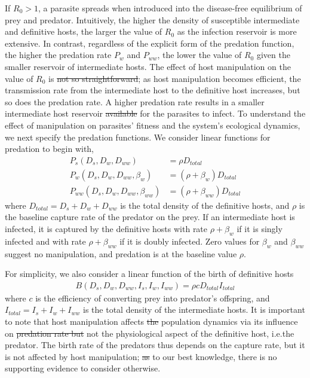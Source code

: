 \documentclass[a4paper]{scrartcl}
\providecommand{\DIFaddtex}[1]{{\protect\color{blue}\uwave{#1}}} %
\providecommand{\DIFdeltex}[1]{{\protect\color{red}\sout{#1}}}                      %
\providecommand{\DIFaddbegin}{} %
\providecommand{\DIFaddend}{} %
\providecommand{\DIFdelbegin}{} %
\providecommand{\DIFdelend}{} %
\providecommand{\DIFadd}[1]{\texorpdfstring{\DIFaddtex{#1}}{#1}} %
\providecommand{\DIFdel}[1]{\texorpdfstring{\DIFdeltex{#1}}{}} %
\newcommand{\DIFscaledelfig}{0.5}
\newlength{\DIFdelgraphicswidth} %
\newlength{\DIFdelgraphicsheight} %
\newcommand{\DIFaddincludegraphics}[2][]{{\color{blue}\fbox{\DIFOincludegraphics[#1]{#2}}}} %
\newcommand{\DIFdelincludegraphics}[2][]{%
\sbox{\DIFdelgraphicsbox}{\DIFOincludegraphics[#1]{#2}}%
\settoboxwidth{\DIFdelgraphicswidth}{\DIFdelgraphicsbox} %
\settoboxtotalheight{\DIFdelgraphicsheight}{\DIFdelgraphicsbox} %
\scalebox{\DIFscaledelfig}{%
\parbox[b]{\DIFdelgraphicswidth}{\usebox{\DIFdelgraphicsbox}\\[-\baselineskip] \rule{\DIFdelgraphicswidth}{0em}}\llap{\resizebox{\DIFdelgraphicswidth}{\DIFdelgraphicsheight}{%
\setlength{\unitlength}{\DIFdelgraphicswidth}%
\begin{picture}(1,1)%
\thicklines\linethickness{2pt} %
{\color[rgb]{1,0,0}\put(0,0){\framebox(1,1){}}}%
{\color[rgb]{1,0,0}\put(0,0){\line( 1,1){1}}}%
{\color[rgb]{1,0,0}\put(0,1){\line(1,-1){1}}}%
\end{picture}%
}\hspace*{3pt}}} %
} %
\DeclareRobustCommand{\DIFaddbegin}{\DIFOaddbegin \let\includegraphics\DIFaddincludegraphics} %
\DeclareRobustCommand{\DIFaddend}{\DIFOaddend \let\includegraphics\DIFOincludegraphics} %
\DeclareRobustCommand{\DIFdelbegin}{\DIFOdelbegin \let\includegraphics\DIFdelincludegraphics} %
\DeclareRobustCommand{\DIFdelend}{\DIFOaddend \let\includegraphics\DIFOincludegraphics} %
\begin{document}
If $R_0 > 1$, a parasite spreads when introduced into the disease-free equilibrium of prey and predator.
Intuitively, the higher the density of susceptible intermediate and definitive hosts, the larger the value of $R_0$ as the infection reservoir is more extensive. 
In contrast, regardless of the explicit form of the predation function, the higher the predation rate $P_w$ and $P_{ww}$, the lower the value of $R_0$ given the smaller reservoir of intermediate hosts. 
The effect of host manipulation on the value of $R_0$ is \DIFdelbegin \DIFdel{not so straightforward}\DIFdelend \DIFaddbegin \DIFadd{more complex}\DIFaddend ; as host manipulation becomes efficient, the transmission rate from the intermediate host to the definitive host increases, but so does the predation rate. 
A higher predation rate results in a smaller intermediate host reservoir \DIFdelbegin \DIFdel{available }\DIFdelend for the parasites to infect. 
To understand the effect of manipulation on parasites' fitness and the system's ecological dynamics, we next specify the predation functions. 
We consider linear functions for predation to begin with,
%
\begin{align*}
 P_s(D_s, D_w, D_{ww}) &= \rho D_{total}  \\
 P_w(D_s, D_w, D_{ww}, \beta_w) &= (\rho + \beta_w) D_{total} \\
 P_{ww}(D_s, D_w, D_{ww}, \beta_{ww}) &=  (\rho + \beta_{ww})D_{total}
\end{align*}
%
where $D_{total} = D_s + D_w + D_{ww}$ is the total density of the definitive hosts, and $\rho$ is the baseline capture rate of the predator on the prey. 
If an intermediate host is infected, it is captured by the definitive hosts with rate $\rho + \beta_w$ if it is singly infected and with rate $\rho + \beta_{ww}$ if it is doubly infected. 
Zero values for $\beta_w$ and $\beta_{ww}$ suggest no manipulation, and predation is at the baseline value $\rho$.

For simplicity, we also consider a linear function of the birth of definitive hosts
%
\begin{align*}
B(D_s, D_w, D_{ww}, I_s, I_w, I_{ww}) = \rho c D_{total} I_{total}
\end{align*}
%
where $c$ is the efficiency of converting prey into predator's offspring, and $I_{total} = I_s + I_w + I_{ww}$ is the total density of the intermediate hosts.
It is important to note that host manipulation affects \DIFdelbegin \DIFdel{the }\DIFdelend population dynamics via its influence on \DIFdelbegin \DIFdel{predation rate but }\DIFdelend \DIFaddbegin \DIFadd{the predation rate, }\DIFaddend not the physiological aspect of the definitive host, i.e.\DIFaddbegin \DIFadd{, }\DIFaddend the predator.
The birth rate of the predators thus depends on the capture rate, but it is not affected by host manipulation; \DIFdelbegin \DIFdel{as }\DIFdelend to our best knowledge, there is no supporting evidence to consider otherwise.
\end{document}
